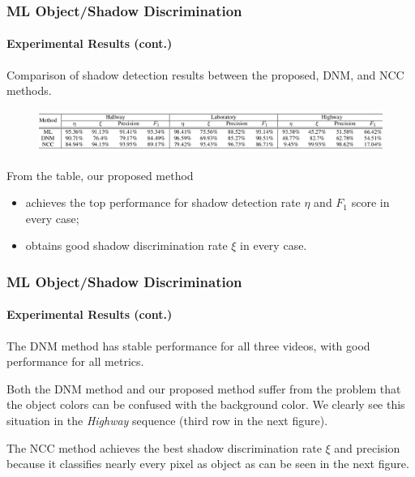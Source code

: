 \begin{frame}
    \frametitle{ML Object/Shadow Discrimination}
    \framesubtitle{Experimental Results (cont.)}

    \begin{table}
        \caption{Comparison of shadow detection results between the
            proposed, DNM, and NCC methods.}
        \label{tab:comparison-results}
        \vspace{-0.2in}
        \centering
        \begin{figure}
            \includegraphics[width=4.85in]{figures/shadow-detection-results.png}
        \end{figure}
    \end{table}
    
    From the table, our proposed method
    \begin{itemize}
        \item achieves the top performance for shadow detection 
            rate $\eta$ and $F_1$ score in every case; 
        \item obtains good shadow discrimination rate $\xi$ in every case.
    \end{itemize}

\end{frame}


\begin{frame}
    \frametitle{ML Object/Shadow Discrimination}
    \framesubtitle{Experimental Results (cont.)}

    The DNM method has stable performance for all three videos, with good 
    performance for all metrics.

    \bigskip

    Both the DNM method and our proposed method suffer from the problem that 
    the object colors can be confused with the background color. We clearly 
    see this situation in the {\em Highway} sequence (third row in the 
    next figure).

    \bigskip
  
    The NCC method achieves the best shadow discrimination rate $\xi$ and 
    precision  because it classifies nearly every pixel as object as can be 
    seen in the next figure.

\end{frame}

